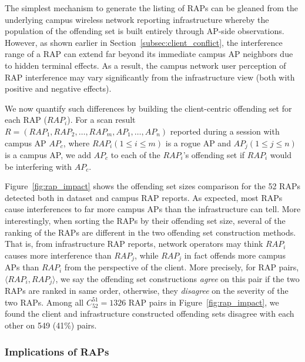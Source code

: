 The simplest mechanism to generate the listing of RAPs can be gleaned from the underlying
campus wireless network reporting infrastructure whereby the population of the offending
set is built entirely through AP-side observations.  However, as shown earlier in
Section~\ref{subsec:client_conflict}, the interference range of a RAP can extend far
beyond its immediate campus AP neighbors due to hidden terminal effects.  As a result,
the campus network user perception of RAP interference may vary significantly from the
infrastructure view (both with positive and negative effects).  

We now quantify such differences by building the client-centric offending set for each
RAP ($RAP_i$).  For a scan result $R=(RAP_1,
RAP_2,\ldots,RAP_m, AP_1, \ldots, AP_n)$ reported during a \wifi{} session with
campus AP $AP_c$, where $RAP_i (1 \le i \le m)$ is a rogue AP and $AP_j(1 \le j
\le n)$ is a campus AP, we add $AP_c$ to each of the $RAP_i$'s offending
set if $RAP_i$ would be interfering with $AP_c$.  


Figure~\ref{fig:rap_impact} shows the offending set sizes comparison for the 52
RAPs detected both in \ubscan{} dataset and campus RAP reports. As expected, most
RAPs cause interferences to far more campus APs than the infrastructure can tell.
More interestingly, when sorting the RAPs by their offending set size, several of
the ranking of the RAPs are different in the two offending set construction methods. 
That is, from infrastructure RAP reports, network operators may think $RAP_i$ causes more
interference than $RAP_j$, while $RAP_j$ in fact offends more campus APs than
$RAP_i$ from the perspective of the client. More precisely, for RAP pairs, $\langle RAP_i,
RAP_j \rangle$, we say the offending set constructions \textit{agree} on this
pair if the two RAPs are ranked in same order, otherwise, they \textit{disagree}
on the severity of the two RAPs. Among all $C_{52}^{51}=1326$ RAP pairs in
Figure~\ref{fig:rap_impact}, we found the client and infrastructure constructed
offending sets disagree with each other on 549 (41\%) pairs.

\subsubsection{Implications of RAPs}
\label{subsec:rap_implicaton}


